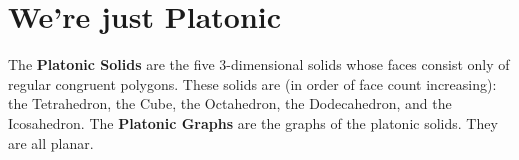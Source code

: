 \section{We're just Platonic}
The \textbf{Platonic Solids} are the five 3-dimensional solids whose faces consist only of regular congruent polygons.\newline
These solids are (in order of face count increasing): the Tetrahedron, the Cube, the Octahedron, the Dodecahedron, and the Icosahedron.\newline %
The \textbf{Platonic Graphs} are the graphs of the platonic solids. They are all planar.
